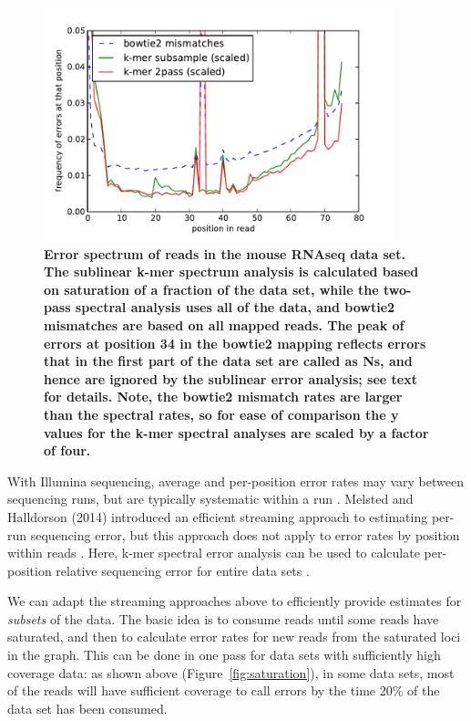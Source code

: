 \documentclass{article}
\begin{document}
\begin{figure}[!ht]
 \centerline{\includegraphics[width=4in]{./figures/rseq-errhist}}
\caption{{\bf Error spectrum of reads in the mouse RNAseq data set.
    The sublinear k-mer spectrum analysis is calculated based on
    saturation of a fraction of the data set, while the two-pass
    spectral analysis uses all of the data, and bowtie2 mismatches are
    based on all mapped reads.  The peak of errors at position 34 in
    the bowtie2 mapping reflects errors that in the first part of the
    data set are called as Ns, and hence are ignored by the sublinear
    error analysis; see text for details. Note, the bowtie2 mismatch
    rates are larger than the spectral rates, so for ease of
    comparison the y values for the k-mer spectral analyses are scaled
    by a factor of four.}}
\label{fig:rseq_err}
\end{figure}

With Illumina sequencing, average and per-position error rates may
vary between sequencing runs, but are typically systematic within a
run \cite{drisee}.  Melsted and Halldorson (2014) introduced an
efficient streaming approach to estimating per-run sequencing error,
but this approach does not apply to error rates by position within
reads \cite{Melsted2014}.  Here, k-mer spectral error analysis can be
used to calculate per-position relative sequencing error for entire
data sets \cite{Zhang2014}.

We can adapt the streaming approaches above to efficiently provide
estimates for {\em subsets} of the data.  The basic idea is to consume
reads until some reads have saturated, and then to calculate error
rates for new reads from the saturated loci in the graph.  This
can be done in one pass for data sets with sufficiently high coverage
data: as shown above (Figure~\ref{fig:saturation}), in some data sets,
most of the reads will have sufficient coverage to call errors by the
time 20\% of the data set has been consumed.
\end{document}
